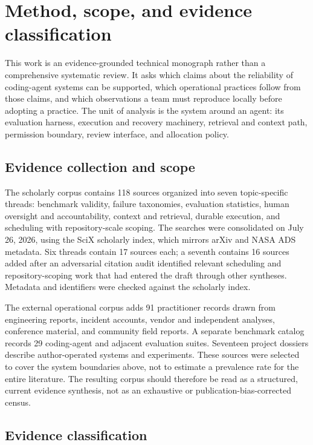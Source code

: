 \chapter{Method, scope, and evidence classification}
\label{method-scope-evidence}

This work is an evidence-grounded technical monograph rather than a comprehensive systematic review. It asks which claims about the reliability of coding-agent systems can be supported, which operational practices follow from those claims, and which observations a team must reproduce locally before adopting a practice. The unit of analysis is the system around an agent: its evaluation harness, execution and recovery machinery, retrieval and context path, permission boundary, review interface, and allocation policy.

\section{Evidence collection and scope}

The scholarly corpus contains 118 sources organized into seven topic-specific threads: benchmark validity, failure taxonomies, evaluation statistics, human oversight and accountability, context and retrieval, durable execution, and scheduling with repository-scale scoping. The searches were consolidated on July 26, 2026, using the SciX scholarly index, which mirrors arXiv and NASA ADS metadata. Six threads contain 17 sources each; a seventh contains 16 sources added after an adversarial citation audit identified relevant scheduling and repository-scoping work that had entered the draft through other syntheses. Metadata and identifiers were checked against the scholarly index.

The external operational corpus adds 91 practitioner records drawn from engineering reports, incident accounts, vendor and independent analyses, conference material, and community field reports. A separate benchmark catalog records 29 coding-agent and adjacent evaluation suites. Seventeen project dossiers describe author-operated systems and experiments. These sources were selected to cover the system boundaries above, not to estimate a prevalence rate for the entire literature. The resulting corpus should therefore be read as a structured, current evidence synthesis, not as an exhaustive or publication-bias-corrected census.

\section{Evidence classification}

